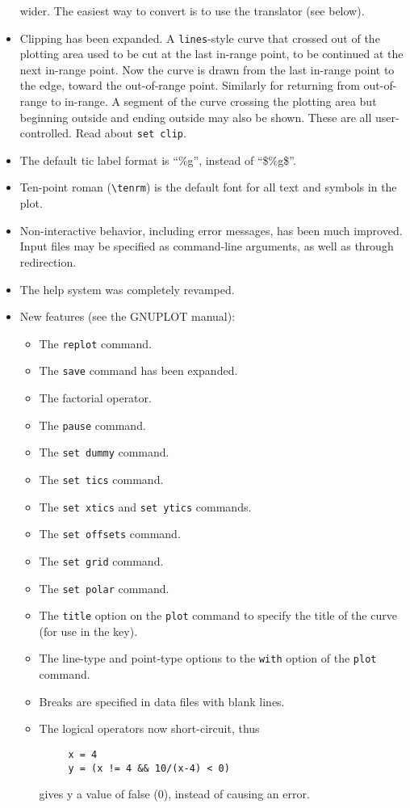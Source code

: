 \begin{itemize}
wider. The easiest way to convert is to use the translator (see
below). 
\item Clipping has been expanded. A {\tt lines}-style curve that
crossed out of the plotting area used to be cut at the last in-range
point, to be continued at the next in-range point. Now the curve is
drawn from the last in-range point to the edge, toward the
out-of-range point. Similarly for returning from out-of-range to
in-range. A segment of the curve crossing the plotting area but
beginning outside and ending outside may also be shown. These are all
user-controlled. Read about {\tt set clip}.
\item The default tic label format is ``\%g'', instead of ``\$\%g\$''.
\item Ten-point roman (\verb+\tenrm+) is the default font for all text
and symbols in the plot. 
\item Non-interactive behavior, including error messages, has been
much improved. Input files may be specified as command-line arguments,
as well as through redirection.
\item The help system was completely revamped.
\item New features (see the GNUPLOT manual):
  \begin{itemize}
  \item The {\tt replot} command.
  \item The {\tt save} command has been expanded.
  \item The factorial operator.
  \item The {\tt pause} command.
  \item The {\tt set dummy} command.
  \item The {\tt set tics} command.
  \item The {\tt set xtics} and {\tt set ytics} commands.
  \item The {\tt set offsets} command.
  \item The {\tt set grid} command.
  \item The {\tt set polar} command.
  \item The {\tt title} option on the {\tt plot} command to
  specify the title of the curve (for use in the key).
  \item The line-type and point-type options to the {\tt with} option
  of the {\tt plot} command. 
  \item Breaks are specified in data files with blank lines.
  \item The logical operators now short-circuit, thus 
\begin{verbatim}
     x = 4
     y = (x != 4 && 10/(x-4) < 0) 
\end{verbatim}
  gives y a value of false (0), instead of causing an error.
  \end{itemize}

\end{itemize}

